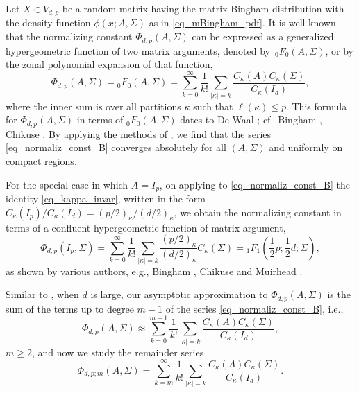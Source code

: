 Let $X \in V_{d,p}$ be a random matrix having the matrix Bingham distribution with the density function $\phi(x;A,\Sigma)$ as in \eqref{eq_mBingham_pdf}. It is well known that the normalizing constant $\Phi_{d,p}(A,\Sigma)$ can be expressed as a generalized hypergeometric function of two matrix arguments, denoted by~${}_0F_0(A,\Sigma)$, or by the zonal polynomial expansion of that function,
\begin{equation}
\label{eq_normaliz_const_B}
\Phi_{d,p}(A,\Sigma) = {}_0F_0(A,\Sigma) = \sum_{k=0}^\infty \frac{1}{k!} \sum_{|\kappa|=k} \frac{C_\kappa(A) C_\kappa(\Sigma)}{C_\kappa(I_d)},
\end{equation}
where the inner sum is over all partitions $\kappa$ such that $\ell(\kappa) \le p$. This formula for $\Phi_{d,p}(A,\Sigma)$ in terms of ${}_0F_0(A,\Sigma)$ dates to De Waal \cite{DeWaal}; cf.\ Bingham \cite{Bingham}, Chikuse \cite[p.~108]{Chikuse}. By applying the methods of \cite[Theorem~6.3]{GrossRichards}, we find that the series \eqref{eq_normaliz_const_B} converges absolutely for all $(A,\Sigma)$ and uniformly on compact regions.

For the special case in which $A = I_p$, on applying to \eqref{eq_normaliz_const_B} the identity \eqref{eq_kappa_invar}, written in the form $C_\kappa(I_p)/C_\kappa(I_d) = (p/2)_\kappa/(d/2)_\kappa$, we obtain the normalizing constant in terms of a confluent hypergeometric function of matrix argument,
\[
\Phi_{d,p}(I_p,\Sigma) = \sum_{k=0}^\infty \frac{1}{k!} \sum_{|\kappa|=k} \frac{(p/2)_\kappa}{(d/2)_\kappa} C_\kappa(\Sigma) = {}_1F_1\left(\frac12 p;\frac12 d;\Sigma\right),
\]
as shown by various authors, e.g., Bingham \cite{Bingham}, Chikuse \cite[p.~33]{Chikuse} and Muirhead \cite[p.~288]{Muirhead}.

Similar to \cite[equation~(2.4)]{BagyanRichards}, when $d$ is large, our asymptotic approximation to $\Phi_{d,p}(A,\Sigma)$ is the sum of the terms up to degree $m-1$ of the series \eqref{eq_normaliz_const_B}, i.e.,
\begin{equation}
\label{eq_trunc_expan}
\Phi_{d,p}(A,\Sigma) \approx \sum_{k=0}^{m-1} \frac{1}{k!} \sum_{|\kappa|=k} \frac{C_\kappa(A) C_\kappa(\Sigma)}{C_\kappa(I_d)},
\end{equation}
$m \ge 2$, and now we study the remainder series
\begin{equation}
\label{eq_remainder_term}
\Phi_{d,p;m}(A,\Sigma) = \sum_{k=m}^\infty \frac{1}{k!} \sum_{|\kappa|=k} \frac{C_\kappa(A) C_\kappa(\Sigma)}{C_\kappa(I_d)}.
\end{equation}

